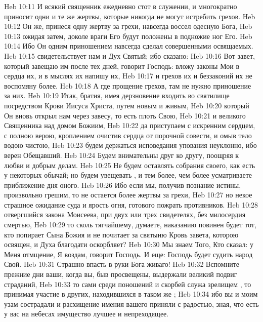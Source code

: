\vs Heb 10:11 И всякий священник ежедневно стот в служении, и многократно приносит одни и те же жертвы, которые никогда не могут истребить грехов.
\vs Heb 10:12 Он же, принеся одну жертву за грехи, навсегда воссел одесную Бога,
\vs Heb 10:13 ожидая затем, доколе враги Его будут положены в подножие ног Его.
\vs Heb 10:14 Ибо Он одним приношением навсегда сделал совершенными освящаемых.
\vs Heb 10:15  свидетельствует нам и Дух Святый; ибо сказано:
\vs Heb 10:16 Вот завет, который завещаю им после тех дней, говорит Господь: вложу законы Мои в сердца их, и в мыслях их напишу их,
\vs Heb 10:17 и грехов их и беззаконий их не воспомяну более.
\vs Heb 10:18 А где прощение грехов, там не нужно приношение за них.
\rsbpar\vs Heb 10:19 Итак, братия, имея дерзновение входить во святилище посредством Крови Иисуса Христа, путем новым и живым,
\vs Heb 10:20 который Он вновь открыл нам через завесу, то есть плоть Свою,
\vs Heb 10:21 и  великого Священника над домом Божиим,
\vs Heb 10:22 да приступаем с искренним сердцем, с полною верою, кроплением очистив сердца от порочной совести, и омыв тело водою чистою,
\vs Heb 10:23 будем держаться исповедания упования неуклонно, ибо верен Обещавший.
\vs Heb 10:24 Будем внимательны друг ко другу, поощряя к любви и добрым делам.
\vs Heb 10:25 Не будем оставлять собрания своего, как есть у некоторых обычай; но будем увещевать , и тем более, чем более усматриваете приближение дня оного.
\rsbpar\vs Heb 10:26 Ибо если мы, получив познание истины, произвольно грешим, то не остается более жертвы за грехи,
\vs Heb 10:27 но некое страшное ожидание суда и ярость огня, готового пожрать противников.
\vs Heb 10:28  отвергшийся закона Моисеева, при двух или трех свидетелях, без милосердия  смертью,
\vs Heb 10:29 то сколь тягчайшему, думаете, наказанию повинен будет тот, кто попирает Сына Божия и не почитает за святыню Кровь завета, которою освящен, и Духа благодати оскорбляет?
\vs Heb 10:30 Мы знаем Того, Кто сказал: у Меня отмщение, Я воздам, говорит Господь. И еще: Господь будет судить народ Свой.
\vs Heb 10:31 Страшно впасть в руки Бога живаго!
\rsbpar\vs Heb 10:32 Вспомните прежние дни ваши, когда вы, быв просвещены, выдержали великий подвиг страданий,
\vs Heb 10:33 то сами среди поношений и скорбей служа зрелищем , то принимая участие в других, находившихся в таком же ;
\vs Heb 10:34 ибо вы и моим узам сострадали и расхищение имения вашего приняли с радостью, зная, что есть у вас на небесах имущество лучшее и непреходящее.
